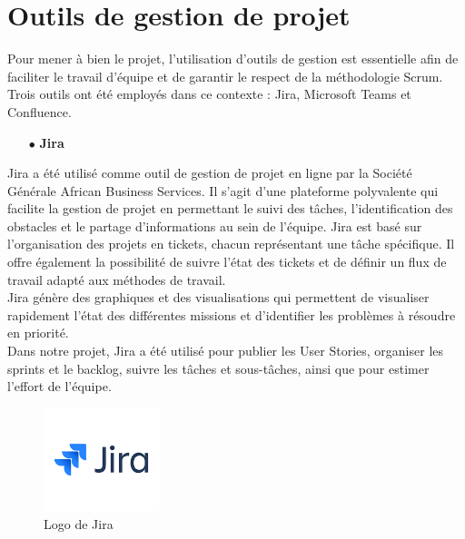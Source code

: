 \section{Outils de gestion de projet}

Pour mener à bien le projet, l'utilisation d'outils de gestion est essentielle afin de faciliter le travail d'équipe et de garantir le respect de la méthodologie Scrum. Trois outils ont été employés dans ce contexte : Jira, Microsoft Teams et Confluence.

\begin{itemize}
\item[$\bullet$] \textbf{Jira}
\end{itemize}
Jira a été utilisé comme outil de gestion de projet en ligne par la Société Générale African Business Services. Il s'agit d'une plateforme polyvalente qui facilite la gestion de projet en permettant le suivi des tâches, l'identification des obstacles et le partage d'informations au sein de l'équipe. Jira est basé sur l'organisation des projets en tickets, chacun représentant une tâche spécifique. Il offre également la possibilité de suivre l'état des tickets et de définir un flux de travail adapté aux méthodes de travail.\\
Jira génère des graphiques et des visualisations qui permettent de visualiser rapidement l'état des différentes missions et d'identifier les problèmes à résoudre en priorité.\\
Dans notre projet, Jira a été utilisé pour publier les User Stories, organiser les sprints et le backlog, suivre les tâches et sous-tâches, ainsi que pour estimer l'effort de l'équipe.
\begin{figure}[!h]
    \centering %
        \includegraphics[height=3cm]{images/logos/jira.png}
    \caption{Logo de Jira}
\end{figure}

